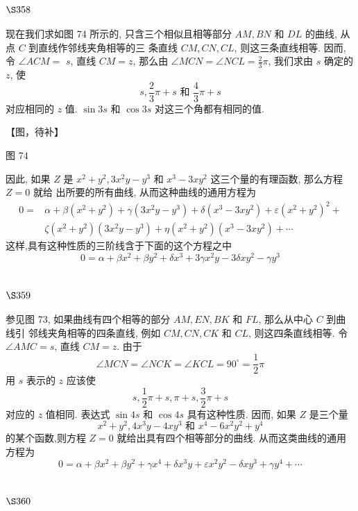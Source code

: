\section{$\S 358$}

现在我们求如图 74 所示的, 只含三个相似且相等部分 $A M, B N$ 和 $D L$ 的曲线, 从点 $C$ 到直线作邻线夹角相等的三 条直线 $C M, C N, C L$, 则这三条直线相等. 因而, 令 $\angle A C M=$ $s$, 直线 $C M=z$, 那么由 $\angle M C N=\angle N C L=\frac{2}{3} \pi$, 我们求由 $s$ 确定的 $z$, 使
\[
s, \frac{2}{3} \pi+s \text { 和 } \frac{4}{3} \pi+s
\]
对应相同的 $z$ 值. $\sin 3 s$ 和 $\cos 3 s$ 对这三个角都有相同的值.


【图，待补】

图 74

因此, 如果 $Z$ 是 $x^{2}+y^{2}, 3 x^{2} y-y^{3}$ 和 $x^{3}-3 x y^{2}$ 这三个量的有理函数, 那么方程 $Z=0$ 就给 出所要的所有曲线, 从而这种曲线的通用方程为
\[
\begin{aligned}
0= & \alpha+\beta\left(x^{2}+y^{2}\right)+\gamma\left(3 x^{2} y-y^{3}\right)+\delta\left(x^{3}-3 x y^{2}\right)+\varepsilon\left(x^{2}+y^{2}\right)^{2}+ \\
& \zeta\left(x^{2}+y^{2}\right)\left(3 x^{2} y-y^{3}\right)+\eta\left(x^{2}+y^{2}\right)\left(x^{3}-3 x y^{2}\right)+\cdots
\end{aligned}
\]
这样,具有这种性质的三阶线含于下面的这个方程之中
\[
0=\alpha+\beta x^{2}+\beta y^{2}+\delta x^{3}+3 \gamma x^{2} y-3 \delta x y^{2}-\gamma y^{3}
\]
\section{$\S 359$}

参见图 73, 如果曲线有四个相等的部分 $A M, E N, B K$ 和 $F L$, 那么从中心 $C$ 到曲线引 邻线夹角相等的四条直线, 例如 $C M, C N, C K$ 和 $C L$, 则这四条直线相等. 令 $\angle A M C=s$, 直线 $C M=z$. 由于
\[
\angle M C N=\angle N C K=\angle K C L=90^{\circ}=\frac{1}{2} \pi
\]
用 $s$ 表示的 $z$ 应该使
\[
s, \frac{1}{2} \pi+s, \pi+s, \frac{3}{2} \pi+s
\]
对应的 $z$ 值相同. 表达式 $\sin 4 s$ 和 $\cos 4 s$ 具有这种性质. 因而, 如果 $Z$ 是三个量
\[
x^{2}+y^{2}, 4 x^{3} y-4 x y^{3} \text { 和 } x^{4}-6 x^{2} y^{2}+y^{4}
\]
的某个函数,则方程 $Z=0$ 就给出具有四个相等部分的曲线. 从而这类曲线的通用方程为
\[
0=\alpha+\beta x^{2}+\beta y^{2}+\gamma x^{4}+\delta x^{3} y+\varepsilon x^{2} y^{2}-\delta x y^{3}+\gamma y^{4}+\cdots
\]
\section{$\S 360$}

